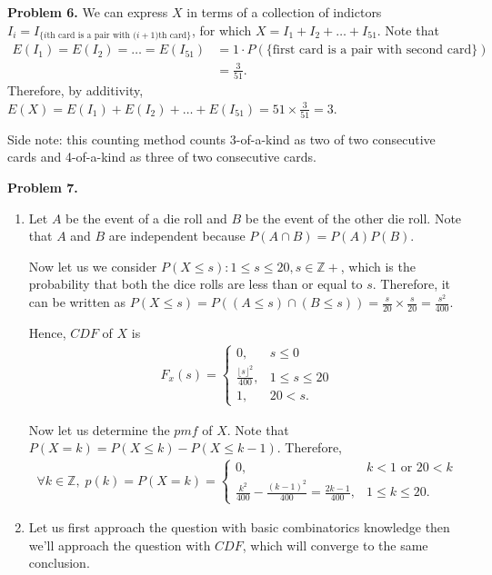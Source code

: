 \documentclass{article}
\begin{document}
\textbf{Problem 6.}
We can express $X$ in terms of a collection of indictors $I_i = I_{\text{\{$i$th card is a pair with ($i+1$)th card\}}}$, for which $X=I_1 + I_2 + \dots + I_{51}$.
Note that 
\begin{align}
    E(I_1) = E(I_2) = \dots = E(I_{51}) & = 1 \cdot P(\text{\{first card is a pair with second card\}}) \\
    & = \frac{3}{51}.
\end{align}
Therefore, by additivity, $E(X)=E(I_1)+E(I_2)+ \dots +E(I_51)=51 \times \frac{3}{51}=3$.

Side note: this counting method counts 3-of-a-kind as two of two consecutive cards and 4-of-a-kind as three of two consecutive cards.
\bigbreak

\textbf{Problem 7.}
\begin{enumerate}[label={(\alph*)}]
    \item 
    Let $A$ be the event of a die roll and $B$ be the event of the other die roll. Note that $A$ and $B$ are independent because $P(A \cap B)=P(A)P(B)$.
    
    Now let us we consider $P(X \le s):1 \le s \le 20, s \in \mathbb{Z+}$, which is the probability that both the dice rolls are less than or equal to $s$. Therefore, it can be written as $P(X \le s)=P((A \le s) \cap (B \le s))=\frac{s}{20} \times \frac{s}{20}=\frac{s^2}{400}$.

    Hence, $CDF$ of $X$ is 
    \begin{align}
        F_x(s) = 
            \begin{cases}
                0, & s \le 0 \\
                \frac{\lfloor s \rfloor ^2}{400}, & 1 \le s \le 20 \\
                1, & 20 < s.
            \end{cases}
    \end{align}

    Now let us determine the $pmf$ of $X$. 
    Note that $P(X=k)=P(X \le k)-P(X \le k-1)$.
    Therefore, 
    \begin{align}
        \forall k \in \mathbb{Z}, \; p(k)=P(X=k)=
        \begin{cases}
            0, & k < 1 \text{ or } 20 < k \\
            \frac{k^2}{400}-\frac{(k-1)^2}{400}=\frac{2k-1}{400}, & 1 \le k \le 20.
        \end{cases}
    \end{align}

    \item
    Let us first approach the question with basic combinatorics knowledge then we'll approach the question with $CDF$, which will converge to the same conclusion.
    

\end{enumerate}
\end{document}
